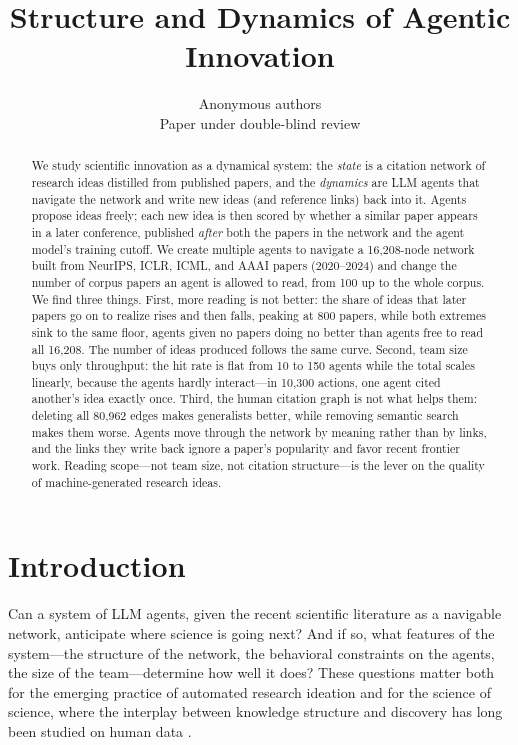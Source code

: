 \documentclass{article} %
\title{Structure and Dynamics of Agentic Innovation}
\author{Anonymous authors\\
Paper under double-blind review}
\begin{document}
\maketitle

\begin{abstract}
We study scientific innovation as a dynamical system: the \emph{state} is a
citation network of research ideas distilled from published papers, and the
\emph{dynamics} are LLM agents that navigate the network and write new ideas
(and reference links) back into it. Agents propose ideas freely; each new idea is then
scored by whether a similar paper appears in a later conference, published
\emph{after} both the papers in the network and the agent model's training
cutoff. 
We create multiple agents to navigate a
16{,}208-node network built from NeurIPS, ICLR, ICML, and AAAI papers
(2020--2024) and change the number
of corpus papers an agent is allowed to read, from 100 up to the whole
corpus. We find three things. First, more reading is not better: the share of
ideas that later papers go on to realize rises and then falls, peaking at 800
papers, while both extremes sink to the same
floor, agents given no papers doing no better than agents free to read
all 16{,}208. The number of ideas produced follows the same curve.
Second, team size buys only throughput: the hit rate is flat from 10 to 150
agents while the total scales linearly, because the agents hardly
interact---in 10{,}300 actions, one agent cited another's idea exactly once.
Third, the human citation graph is not what helps them: deleting all 80{,}962
edges makes generalists better, while removing semantic
search makes them worse. Agents move through the network by meaning rather
than by links, and the links they write back ignore a paper's popularity and
favor recent frontier work. Reading scope---not team size, not citation
structure---is the lever on the quality of machine-generated research ideas.
\end{abstract}

\section{Introduction}

Can a system of LLM agents, given the recent scientific literature as a
navigable network, anticipate where science is going next? And if so, what
features of the system---the structure of the network, the behavioral
constraints on the agents, the size of the team---determine how well it
does? These questions matter both for the emerging practice of automated
research ideation \citep{lu2024aiscientist,si2024llmideas} and for the
science of science, where the interplay between knowledge structure and
discovery has long been studied on human data
\citep{fortunato2018science,uzzi2013atypical,wu2019teams}.
\end{document}

